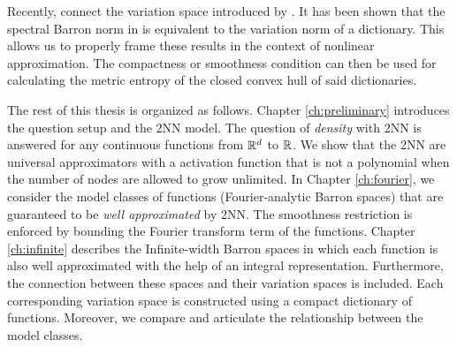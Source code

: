 Recently, \cite{siegelCharacterizationVariationSpaces2022} connect the variation
space introduced by \cite{parhiBanachSpaceRepresenter2021,
parhiWhatKindsFunctions2022}. It has been shown that the spectral Barron norm in
is equivalent to the variation norm of a dictionary. This allows us to properly
frame these results in the context of nonlinear approximation. The compactness
or smoothness condition can then be used for calculating the metric entropy of
the closed convex hull of said dictionaries.




The rest of this thesis is organized as follows. Chapter \ref{ch:preliminary}
introduces the question setup and the 2NN model. The question of
\textit{density} with 2NN is answered for any continuous functions from $\mathbb{R}^d$
to $\mathbb{R}$. We show that the 2NN are universal approximators with a activation
function that is not a polynomial when the number of nodes are allowed to grow
unlimited. In Chapter \ref{ch:fourier}, we consider the model classes of
functions (Fourier-analytic Barron spaces) that are guaranteed to be
\textit{well approximated} by 2NN. The smoothness restriction is enforced by
bounding the Fourier transform term of the functions. Chapter \ref{ch:infinite}
describes the Infinite-width Barron spaces in which each function is also well
approximated with the help of an integral representation. Furthermore, the
connection between these spaces and their variation spaces is included. Each
corresponding variation space is constructed using a compact dictionary of
functions. Moreover, we compare and articulate the relationship between the
model classes.



